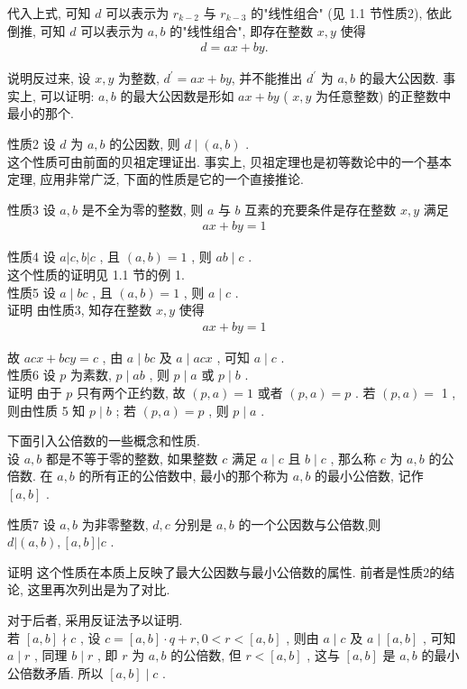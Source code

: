 代入上式, 可知 $d$ 可以表示为 $r_{k-2}$ 与 $r_{k-3}$ 的"线性组合" (见 1.1 节性质2), 依此倒推, 可知 $d$ 可以表示为 $a, b$ 的"线性组合", 即存在整数 $x, y$ 使得
\begin{align*}
	d=a x+b y .
\end{align*}

说明反过来, 设 $x ,  y$ 为整数, $d^{\prime}=a x+b y$, 并不能推出 $d^{\prime}$ 为 $a ,  b$ 的最大公因数. 事实上, 可以证明: $a ,  b$ 的最大公因数是形如 $a x+b y$ ( $x, y$ 为任意整数) 的正整数中最小的那个.

性质2 设 $d$ 为 $a ,  b$ 的公因数, 则 $d \mid(a, b)$ . \\
这个性质可由前面的贝祖定理证出. 事实上, 贝祖定理也是初等数论中的一个基本定理, 应用非常广泛, 下面的性质是它的一个直接推论.

性质3 设 $a ,  b$ 是不全为零的整数, 则 $a$ 与 $b$ 互素的充要条件是存在整数 $x ,  y$ 满足
\begin{align*}
	a x+b y=1
\end{align*}

性质4 设 $a|c, b| c$ , 且 $(a, b)=1$ , 则 $a b \mid c$ . \\
这个性质的证明见 1.1 节的例 1.\\
性质5 设 $a \mid b c$ , 且 $(a, b)=1$ , 则 $a \mid c$ . \\
证明 由性质3, 知存在整数 $x, y$ 使得
\begin{align*}
	a x+b y=1
\end{align*}

故 $a c x+b c y=c$ , 由 $a \mid b c$ 及 $a \mid a c x$ , 可知 $a \mid c$ . \\
性质6 设 $p$ 为素数,  $p \mid a b$ , 则 $p \mid a$ 或 $p \mid b$ . \\
证明 由于 $p$ 只有两个正约数, 故 $(p, a)=1$ 或者 $(p, a)=p$ . 若 $(p, a)=$ 1 , 则由性质 5 知 $p \mid b$ ; 若 $(p, a)=p$ , 则 $p \mid a$ .

下面引入公倍数的一些概念和性质. \\
设 $a ,  b$ 都是不等于零的整数, 如果整数 $c$ 满足 $a \mid c$ 且 $b \mid c$ , 那么称 $c$ 为 $a ,  b$ 的公倍数. 在 $a ,  b$ 的所有正的公倍数中, 最小的那个称为 $a ,  b$ 的最小公倍数, 记作 $[a, b]$ .

性质7 设 $a ,  b$ 为非零整数, $d ,  c$ 分别是 $a ,  b$ 的一个公因数与公倍数,则 $d|(a, b),[a, b]| c$ .

证明 这个性质在本质上反映了最大公因数与最小公倍数的属性. 前者是性质2的结论, 这里再次列出是为了对比.

对于后者, 采用反证法予以证明. \\
若 $[a, b] \nmid c$ , 设 $c=[a, b] \cdot q+r, 0<r<[a, b]$ , 则由 $a \mid c$ 及 $a \mid[a, b]$ , 可知 $a \mid r$ , 同理 $b \mid r$ , 即 $r$ 为 $a ,  b$ 的公倍数, 但 $r<[a, b]$ , 这与 $[a, b]$ 是 $a ,  b$ 的最小公倍数矛盾. 所以 $[a, b] \mid c$ .

